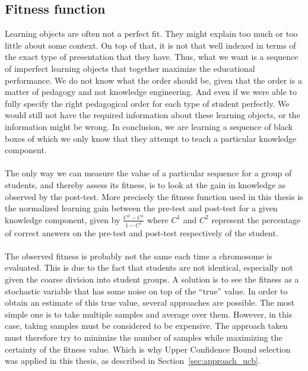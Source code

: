 \subsection{Fitness function}
Learning objects are often not a perfect fit. They might explain too much or too
little about some context. On top of that, it is not that well indexed in terms of the
exact type of presentation that they have. Thus, what we want is a
sequence of imperfect learning objects that together maximize the
educational performance. We do not know what the order should be, given
that the order is a matter of pedagogy and not knowledge engineering.
And even if we were able to fully specify the right pedagogical order
for each type of student perfectly. We would still not have the
required information about these learning objects, or the information
might be wrong. In conclusion, we are learning a sequence of black
boxes of which we only know that they attempt to teach a particular
knowledge component.\\\\
\noindent
The only way we can measure the value of a particular sequence for a
group of students, and thereby assess its fitness, is to look at the
gain in knowledge as observed by the post-test. More precisely the fitness
function used in this thesis is the normalized learning gain between the
pre-test and post-test for a given knowledge component, given by $\frac{C^2 -
C^1}{1-C^1}$ where $C^1$ and $C^2$ represent the percentage of correct answers
on the pre-test and post-test respectively of the student.\\\\
\noindent
The observed fitness is probably not the same each time a chromosome
is evaluated. This is due to the fact that students are not identical,
especially not given the coarse division into student groups. A solution
is to see the fitness as a stochastic variable that has some noise on
top of the ``true'' value. In order to obtain an estimate of this true
value, several approaches are possible. The most simple one is to take
multiple samples and average over them. However, in this case, taking
samples must be considered to be expensive. The approach taken must
therefore try to minimize the number of samples while maximizing the
certainty of the fitness value. Which is why Upper Confidence Bound selection
was applied in this thesis, as described in Section~\ref{sec:approach_ucb}.

